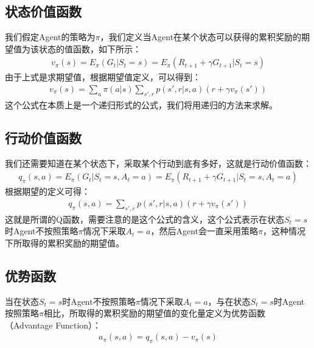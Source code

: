 \subsection{状态价值函数}
我们假定Agent的策略为$\pi$，我们定义当Agent在某个状态可以获得的累积奖励的期望值为该状态的值函数，如下所示：
\begin{equation}
\begin{aligned}
v_{\pi}(s) = E_{\pi}(G_{t} | S_{t}=s) = E_{\pi} (R_{t+1} + \gamma G_{t+1} | S_{t}=s)
\end{aligned}
\label{state-value-function-definition}
\end{equation}
由于上式是求期望值，根据期望值定义，可以得到：
\begin{equation}
\begin{aligned}
v_{\pi}(s) = \sum_{a} \pi (a|s) \sum_{s', r} p(s', r | s, a) (r + \gamma v_{\pi}(s'))
\end{aligned}
\label{state-value-function-definition-detail}
\end{equation}
这个公式在本质上是一个递归形式的公式，我们将用递归的方法来求解。

\subsection{行动价值函数}
我们还需要知道在某个状态下，采取某个行动到底有多好，这就是行动价值函数：
\begin{equation}
\begin{aligned}
q_{\pi}(s, a) = E_{\pi}(G_{t} | S_{t}=s, A_{t}=a) = E_{\pi} (R_{t+1} + \gamma G_{t+1} | S_{t}=s, A_{t}=a)
\end{aligned}
\label{action-value-function-definition}
\end{equation}
根据期望的定义可得：
\begin{equation}
\begin{aligned}
q_{\pi}(s, a) = \sum_{s', r} p(s', r | s, a) (r + \gamma v_{\pi}(s'))
\end{aligned}
\label{action-value-function-definition-detail}
\end{equation}
这就是所谓的Q函数，需要注意的是这个公式的含义，这个公式表示在状态$S_{t}=s$时Agent不按照策略$\pi$情况下采取$A_{t}=a$，然后Agent会一直采用策略$\pi$，这种情况下所取得的累积奖励的期望值。

\subsection{优势函数}
当在状态$S_{t}=s$时Agent不按照策略$\pi$情况下采取$A_{t}=a$，与在状态$S_{t}=s$时Agent按照策略$\pi$相比，所取得的累积奖励的期望值的变化量定义为优势函数（Advantage Function）：
\begin{equation}
\begin{aligned}
a_{\pi}(s, a) = q_{\pi}(s, a) - v_{\pi}(s)
\end{aligned}
\label{action-value-function-definition-detail}
\end{equation}

